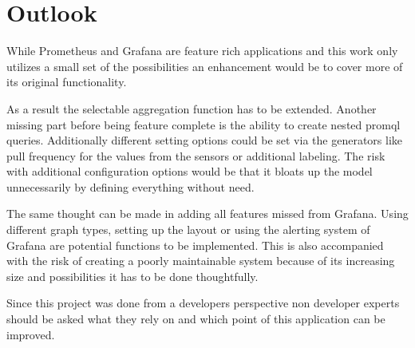 \section{Outlook}

While Prometheus and Grafana are feature rich applications and this work only utilizes a small set of the possibilities an enhancement would be to cover more of its original functionality.

As a result the selectable aggregation function has to be extended. Another missing part before being feature complete is the ability to create nested \gls{promql} queries. Additionally different setting options could be set via the generators like pull frequency for the values from the sensors or additional labeling. The risk with additional configuration options would be that it bloats up the model unnecessarily by defining everything without need.

The same thought can be made in adding all features missed from Grafana. Using different graph types, setting up the layout or using the alerting system of Grafana are potential functions to be implemented. This is also accompanied with the risk of creating a poorly maintainable system because of its increasing size and possibilities it has to be done thoughtfully.

Since this project was done from a developers perspective non developer experts should be asked what they rely on and which point of this application can be improved.


